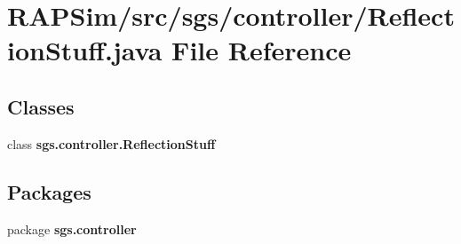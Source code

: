 \section{R\-A\-P\-Sim/src/sgs/controller/\-Reflection\-Stuff.java File Reference}
\label{_reflection_stuff_8java}
\subsection*{Classes}
\begin{DoxyCompactItemize}
\item 
class {\bf sgs.\-controller.\-Reflection\-Stuff}
\end{DoxyCompactItemize}
\subsection*{Packages}
\begin{DoxyCompactItemize}
\item 
package {\bf sgs.\-controller}
\end{DoxyCompactItemize}
